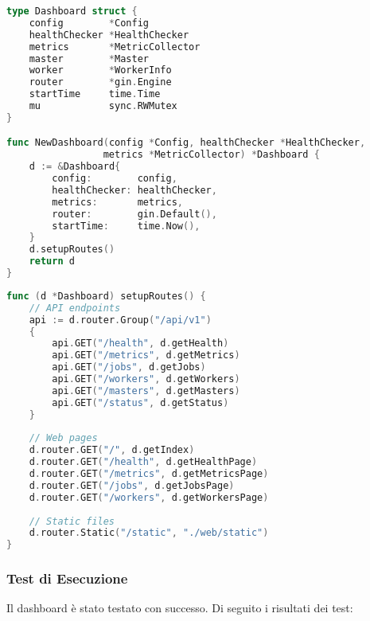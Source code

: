 \documentclass[12pt,a4paper]{article}
\begin{document}
\begin{lstlisting}[language=go, caption=Struttura Dashboard e Inizializzazione]
type Dashboard struct {
    config        *Config
    healthChecker *HealthChecker
    metrics       *MetricCollector
    master        *Master
    worker        *WorkerInfo
    router        *gin.Engine
    startTime     time.Time
    mu            sync.RWMutex
}

func NewDashboard(config *Config, healthChecker *HealthChecker, 
                 metrics *MetricCollector) *Dashboard {
    d := &Dashboard{
        config:        config,
        healthChecker: healthChecker,
        metrics:       metrics,
        router:        gin.Default(),
        startTime:     time.Now(),
    }
    d.setupRoutes()
    return d
}
\end{lstlisting}

\begin{lstlisting}[language=go, caption=Configurazione delle Route]
func (d *Dashboard) setupRoutes() {
    // API endpoints
    api := d.router.Group("/api/v1")
    {
        api.GET("/health", d.getHealth)
        api.GET("/metrics", d.getMetrics)
        api.GET("/jobs", d.getJobs)
        api.GET("/workers", d.getWorkers)
        api.GET("/masters", d.getMasters)
        api.GET("/status", d.getStatus)
    }
    
    // Web pages
    d.router.GET("/", d.getIndex)
    d.router.GET("/health", d.getHealthPage)
    d.router.GET("/metrics", d.getMetricsPage)
    d.router.GET("/jobs", d.getJobsPage)
    d.router.GET("/workers", d.getWorkersPage)
    
    // Static files
    d.router.Static("/static", "./web/static")
}
\end{lstlisting}

\subsubsection{Test di Esecuzione}

Il dashboard è stato testato con successo. Di seguito i risultati dei test:
\end{document}
